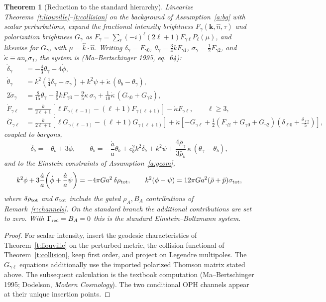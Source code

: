 \documentclass[11pt]{article}
\newtheorem{theorem}{Theorem}[section]
\theoremstyle{remark}
\newcommand{\ah}{\frac{\dot a}{a}}
\newcommand{\kdot}{\dot\kappa}
\begin{document}
\begin{theorem}[Reduction to the standard hierarchy]\label{t:hierarchy}
Linearize Theorems~\ref{t:liouville}--\ref{t:collision} on the background of
Assumption~\ref{a:bg} with scalar perturbations, expand the fractional
intensity brightness $F_\gamma(\mathbf k,\hat n,\tau)$ and polarization
brightness $G_\gamma$ as
$F_\gamma=\sum_\ell(-i)^\ell(2\ell+1)F_{\gamma\ell}P_\ell(\mu)$,
and likewise for $G_\gamma$, with $\mu=\hat k\cdot\hat n$. Writing
$\delta_\gamma=F_{\gamma0}$, $\theta_\gamma=\tfrac34 kF_{\gamma1}$,
$\sigma_\gamma=\tfrac12F_{\gamma2}$, and $\kdot\equiv a n_e\sigma_T$, the
system is (Ma--Bertschinger 1995, eq.~64):
\begin{align*}
\dot\delta_\gamma &= -\tfrac43\theta_\gamma+4\dot\phi,\\
\dot\theta_\gamma &= k^2\!\left(\tfrac14\delta_\gamma-\sigma_\gamma\right)
+k^2\psi+\kdot\,(\theta_b-\theta_\gamma),\\
2\dot\sigma_\gamma &= \tfrac{8}{15}\theta_\gamma-\tfrac35 kF_{\gamma3}
-\tfrac95\kdot\,\sigma_\gamma
+\tfrac{1}{10}\kdot\,(G_{\gamma0}+G_{\gamma2}),\\
\dot F_{\gamma\ell} &= \frac{k}{2\ell+1}\left[\ell F_{\gamma(\ell-1)}
-(\ell+1)F_{\gamma(\ell+1)}\right]-\kdot F_{\gamma\ell},
\qquad \ell\ge3,\\
\dot G_{\gamma\ell} &= \frac{k}{2\ell+1}\left[\ell G_{\gamma(\ell-1)}
-(\ell+1)G_{\gamma(\ell+1)}\right]
+\kdot\left[-G_{\gamma\ell}
+\tfrac12\left(F_{\gamma2}+G_{\gamma0}+G_{\gamma2}\right)
\left(\delta_{\ell0}+\tfrac{\delta_{\ell2}}{5}\right)\right],
\end{align*}
coupled to baryons,
\[
\dot\delta_b=-\theta_b+3\dot\phi,\qquad
\dot\theta_b=-\ah\theta_b+c_b^2k^2\delta_b+k^2\psi
+\frac{4\bar\rho_\gamma}{3\bar\rho_b}\,\kdot\,(\theta_\gamma-\theta_b),
\]
and to the Einstein constraints of Assumption~\ref{a:geom},
\[
k^2\phi+3\ah\!\left(\dot\phi+\ah\psi\right)=-4\pi G a^2\,\delta\rho_{\rm tot},
\qquad
k^2(\phi-\psi)=12\pi G a^2(\bar\rho+\bar p)\sigma_{\rm tot},
\]
where $\delta\rho_{\rm tot}$ and $\sigma_{\rm tot}$ include the gated
$\rho_A,B_A$ contributions of Remark~\ref{r:channels}. On the standard branch the additional contributions are set to zero.
With $\Gamma_{\rm rec}=B_A=0$ this is the standard
Einstein--Boltzmann system.
\end{theorem}

\begin{proof}
For scalar intensity, insert the geodesic characteristics of
Theorem~\ref{t:liouville} on the perturbed metric, the collision functional
of Theorem~\ref{t:collision}, keep first order, and project on Legendre
multipoles. The $G_{\gamma\ell}$ equations additionally use the imported
polarized Thomson matrix stated above. The subsequent calculation is the
textbook computation (Ma--Bertschinger 1995; Dodelson, \emph{Modern
Cosmology}). The two conditional OPH channels appear at their unique insertion
points.
\end{proof}
\end{document}
